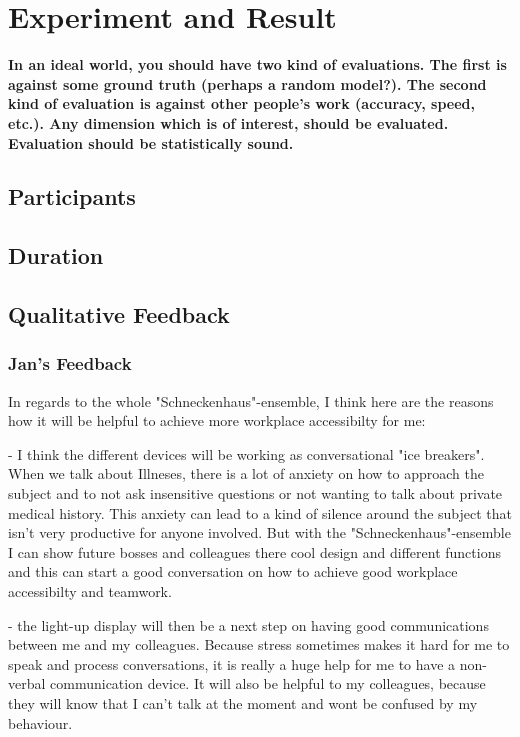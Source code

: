 \chapter{Experiment and Result}

\textbf{In an ideal world, you should have two kind of evaluations.  The first is against some ground truth (perhaps a random model?).  The second kind of evaluation is against other people's work (accuracy, speed, etc.).  Any dimension which is of interest, should be evaluated.  Evaluation should be statistically sound. }


\section{Participants}
\section{Duration}
\section{Qualitative Feedback}
\subsection{Jan's Feedback}
In regards to the whole "Schneckenhaus"-ensemble, I think here are the reasons how it will be helpful to achieve more workplace accessibilty for me:

- I think the different devices will be working as conversational "ice breakers". When we talk about Illneses, there is a lot of anxiety on how to approach the subject and to not ask insensitive questions or not wanting to talk about private medical history. This anxiety can lead to a kind of silence around the subject that isn't very productive for anyone involved. But with the "Schneckenhaus"-ensemble I can show future bosses and colleagues there cool design and different functions and this can start a good conversation on how to achieve good workplace accessibilty and teamwork.

- the light-up display will then be a next step on having good communications between me and my colleagues. Because stress sometimes makes it hard for me to speak and process conversations, it is really a huge help for me to have a non-verbal communication device. It will also be helpful to my colleagues, because they will know that I can't talk at the moment and wont be confused by my behaviour.

